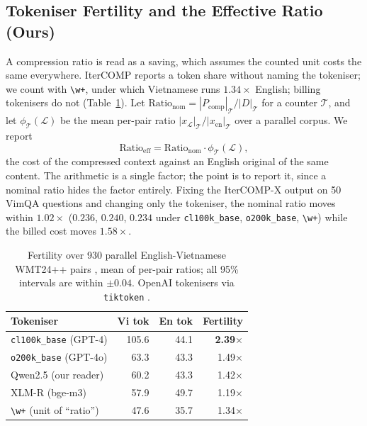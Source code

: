 \documentclass[runningheads]{llncs}
\begin{document}
\subsection{Tokeniser Fertility and the Effective Ratio (Ours)}
\label{sec:fertility}
A compression ratio is read as a saving, which assumes the counted unit costs the
same everywhere. IterCOMP reports a token share without naming the
tokeniser; we count with \texttt{\textbackslash w+}, under
which Vietnamese runs $1.34\times$ English; billing tokenisers do not
(Table~\ref{tab:fertility}). Let $\text{Ratio}_{\text{nom}} =
|P_{\text{comp}}|_{\mathcal{T}} / |D|_{\mathcal{T}}$ for a counter
$\mathcal{T}$, and let $\phi_{\mathcal{T}}(\mathcal{L})$ be the mean per-pair
ratio $|x_{\mathcal{L}}|_{\mathcal{T}}/|x_{\text{en}}|_{\mathcal{T}}$ over a
parallel corpus. We report
\begin{equation}
\text{Ratio}_{\text{eff}} = \text{Ratio}_{\text{nom}} \cdot \phi_{\mathcal{T}}(\mathcal{L}),
\label{eq:effratio}
\end{equation}
the cost of the compressed context against an English original of the same
content. The arithmetic is a single factor; the point is to report it, since a
nominal ratio hides the factor entirely. Fixing the IterCOMP-X output on 50
VimQA questions and changing only the tokeniser, the nominal ratio moves within
$1.02\times$ ($0.236$, $0.240$, $0.234$ under \texttt{cl100k\_base},
\texttt{o200k\_base}, \texttt{\textbackslash w+}) while the billed cost moves
$1.58\times$.

\begin{table}[H]
\centering
\caption{Fertility over 930 parallel English-Vietnamese WMT24++ pairs
\cite{deutsch2025wmt24pp}, mean of per-pair ratios; all 95\% intervals are within
$\pm0.04$. OpenAI tokenisers via \texttt{tiktoken} \cite{openai2024tiktoken}.}
\label{tab:fertility}
\small
\begin{tabular}{lrrr}
\toprule
Tokeniser & Vi tok & En tok & Fertility \\
\midrule
\texttt{cl100k\_base} (GPT-4) & 105.6 & 44.1 & \textbf{2.39}$\times$ \\
\texttt{o200k\_base} (GPT-4o) & 63.3 & 43.3 & 1.49$\times$ \\
Qwen2.5 (our reader) & 60.2 & 43.3 & 1.42$\times$ \\
XLM-R (bge-m3) & 57.9 & 49.7 & 1.19$\times$ \\
\texttt{\textbackslash w+} (unit of ``ratio'') & 47.6 & 35.7 & 1.34$\times$ \\
\bottomrule
\end{tabular}
\end{table}
\end{document}
